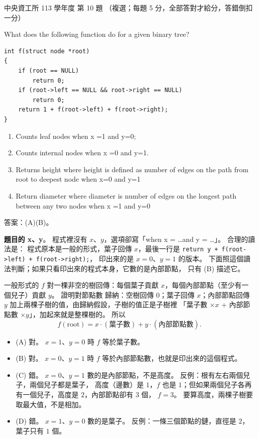 \begin{pastexam}[label={px:ncu-113-dsa-10}]{中央資工所 113 學年度 第 10 題}
（複選；每題 5 分，全部答對才給分，答錯倒扣一分）

What does the following function do for a given binary tree?
\begin{verbatim}
int f(struct node *root)
{
    if (root == NULL)
        return 0;
    if (root->left == NULL && root->right == NULL)
        return 0;
    return 1 + f(root->left) + f(root->right);
}
\end{verbatim}
\begin{enumerate}[label=(\Alph*)]
\item Counts leaf nodes when x =1 and y=0;
\item Counts internal nodes when x =0 and y=1.
\item Returns height where height is defined as number of edges on the path from root to deepest node when
x=0 and y=1
\item Return diameter where diameter is number of edges on the longest path between any two nodes when x =1
and y=0
\end{enumerate}
\end{pastexam}

\begin{pastsoln}
答案：(A)(B)。

\textbf{題目的 x、y}。 程式裡沒有 $x$、$y$，選項卻寫「when x = \ldots and y = \ldots」。 合理的讀法是：
程式原本是一般的形式，葉子回傳 $x$，最後一行是 \texttt{return y + f(root->left) + f(root->right);}，
印出來的是 $x = 0$、$y = 1$ 的版本。 下面照這個讀法判斷；如果只看印出來的程式本身，它數的是內部節點，
只有 (B) 描述它。

一般形式的 $f$ 對一棵非空的樹回傳：每個葉子貢獻 $x$，每個內部節點（至少有一個兒子）貢獻 $y$。 證明對節點數
歸納：空樹回傳 $0$；葉子回傳 $x$；內部節點回傳 $y$ 加上兩棵子樹的值，由歸納假設，子樹的值正是子樹裡
「葉子數 $\times x$ + 內部節點數 $\times y$」，加起來就是整棵樹的。 所以
\[
f(\text{root}) = x \cdot (\text{葉子數}) + y \cdot (\text{內部節點數}).
\]

\begin{itemize}
\item (A) 對。 $x = 1$、$y = 0$ 時 $f$ 等於葉子數。
\item (B) 對。 $x = 0$、$y = 1$ 時 $f$ 等於內部節點數，也就是印出來的這個程式。
\item (C) 錯。 $x = 0$、$y = 1$ 數的是內部節點，不是高度。 反例：根有左右兩個兒子，兩個兒子都是葉子，
高度（邊數）是 $1$，$f$ 也是 $1$；但如果兩個兒子各再有一個兒子，高度是 $2$，內部節點卻有 $3$ 個，
$f = 3$。 要算高度，兩棵子樹要取最大值，不是相加。
\item (D) 錯。 $x = 1$、$y = 0$ 數的是葉子。 反例：一條三個節點的鏈，直徑是 $2$，葉子只有 $1$ 個。
\end{itemize}
\end{pastsoln}
